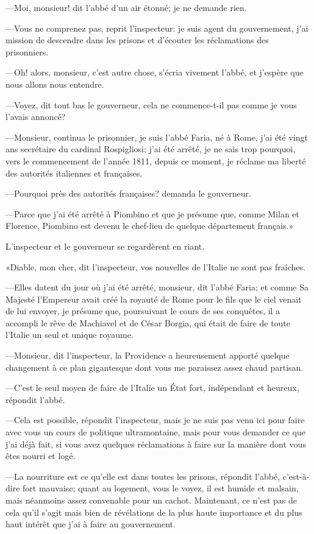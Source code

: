 —Moi, monsieur! dit l'abbé d'un air étonné; je ne demande rien.

—Vous ne comprenez pas, reprit l'inspecteur: je suis agent du gouvernement, j'ai mission de descendre dans les prisons et d'écouter les réclamations des prisonniers.

—Oh! alors, monsieur, c'est autre chose, s'écria vivement l'abbé, et j'espère que nous allons nous entendre.

—Voyez, dit tout bas le gouverneur, cela ne commence-t-il pas comme je vous l'avais annoncé?

—Monsieur, continua le prisonnier, je suis l'abbé Faria, né à Rome, j'ai été vingt ans secrétaire du cardinal Rospigliosi; j'ai été arrêté, je ne sais trop pourquoi, vers le commencement de l'année 1811, depuis ce moment, je réclame ma liberté des autorités italiennes et françaises.

—Pourquoi près des autorités françaises? demanda le gouverneur.

—Parce que j'ai été arrêté à Piombino et que je présume que, comme Milan et Florence, Piombino est devenu le chef-lieu de quelque département français.»

L'inspecteur et le gouverneur se regardèrent en riant.

«Diable, mon cher, dit l'inspecteur, vos nouvelles de l'Italie ne sont pas fraîches.

—Elles datent du jour où j'ai été arrêté, monsieur, dit l'abbé Faria; et comme Sa Majesté l'Empereur avait créé la royauté de Rome pour le fils que le ciel venait de lui envoyer, je présume que, poursuivant le cours de ses conquêtes, il a accompli le rêve de Machiavel et de César Borgia, qui était de faire de toute l'Italie un seul et unique royaume.

—Monsieur, dit l'inspecteur, la Providence a heureusement apporté quelque changement à ce plan gigantesque dont vous me paraissez assez chaud partisan.

—C'est le seul moyen de faire de l'Italie un État fort, indépendant et heureux, répondit l'abbé.

—Cela est possible, répondit l'inspecteur, mais je ne suis pas venu ici pour faire avec vous un cours de politique ultramontaine, mais pour vous demander ce que j'ai déjà fait, si vous avez quelques réclamations à faire sur la manière dont vous êtes nourri et logé.

—La nourriture est ce qu'elle est dans toutes les prisons, répondit l'abbé, c'est-à-dire fort mauvaise; quant au logement, vous le voyez, il est humide et malsain, mais néanmoins assez convenable pour un cachot. Maintenant, ce n'est pas de cela qu'il s'agit mais bien de révélations de la plus haute importance et du plus haut intérêt que j'ai à faire au gouvernement.

